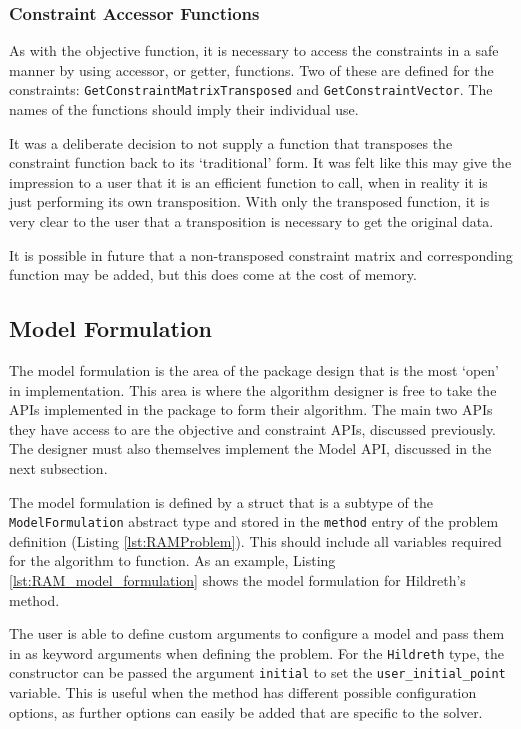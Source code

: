 \subsubsection{Constraint Accessor Functions}

As with the objective function, it is necessary to access the constraints in a safe manner by using accessor, or getter, functions. Two of these are defined for the constraints: \texttt{GetConstraintMatrixTransposed} and \texttt{GetConstraintVector}. The names of the functions should imply their individual use. 

It was a deliberate decision to not supply a function that transposes the constraint function back to its `traditional' form. It was felt like this may give the impression to a user that it is an efficient function to call, when in reality it is just performing its own transposition. With only the transposed function, it is very clear to the user that a transposition is necessary to get the original data.

It is possible in future that a non-transposed constraint matrix and corresponding function may be added, but this does come at the cost of memory. 

\subsection{Model Formulation}
The model formulation is the area of the package design that is the most `open' in implementation. This area is where the algorithm designer is free to take the APIs implemented in the package to form their algorithm. The main two APIs they have access to are the objective and constraint APIs, discussed previously. The designer must also themselves implement the Model API, discussed in the next subsection.

The model formulation is defined by a struct that is a subtype of the \texttt{ModelFormulation} abstract type and stored in the \texttt{method} entry of the problem definition (Listing \ref{lst:RAMProblem}). This should include all variables required for the algorithm to function. As an example, Listing \ref{lst:RAM_model_formulation} shows the model formulation for Hildreth's method. 



The user is able to define custom arguments to configure a model and pass them in as keyword arguments when defining the problem. For the \texttt{Hildreth} type, the constructor can be passed the argument \texttt{initial} to set the \texttt{user\_initial\_point} variable. This is useful when the method has different possible configuration options, as further options can easily be added that are specific to the solver.

